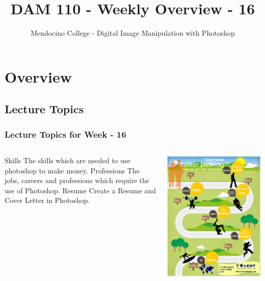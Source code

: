 \documentclass{beamer}
\title{DAM 110 - Weekly Overview - 16}
\author{Mendocino College - Digital Image Manipulation with Photoshop}
\date{\vspace{-5em}}
\begin{document}
	{
		\begin{frame}
			\vspace{-35pt}
			\maketitle
		\end{frame}
	}

	\section{Overview}
			\subsection{Lecture Topics}		
	\begin{frame}
		\frametitle{Lecture Topics for Week - 16}
				\begin{columns}
				\column{.5\textwidth}
				\vspace{-25pt}
				\begin{outline}
					\1 Skills
					\2 The skills which are needed to use photoshop to make money.
					\1 Professions
					\2 The jobs, careers and professions which require the use of Photoshop.
					\1 Resume
					\2 Create a Resume and Cover Letter in Photoshop.
				\end{outline}
				\column{.5\textwidth}
				\vspace{-22pt}
				\begin{center}
					\includegraphics[width=1.10\textwidth]{images/careerpathing-infographic_51a45f3a9e17a_w1500.jpg}

\end{center}
\end{columns}
\end{frame}
\end{document}

